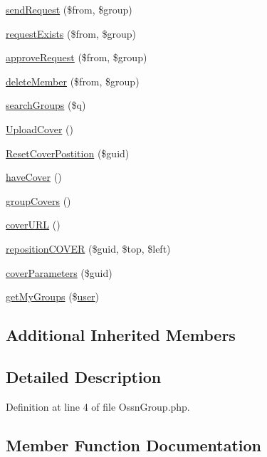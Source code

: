 \begin{DoxyCompactItemize}
\item 
\hyperlink{class_ossn_group_a74cf873217411619b5214ef4546bdaf6}{send\+Request} (\$from, \$group)
\item 
\hyperlink{class_ossn_group_a1845c2df62ccdef4f3fa076e42280877}{request\+Exists} (\$from, \$group)
\item 
\hyperlink{class_ossn_group_ae75e51db4e647a7bc8badf2d9630e475}{approve\+Request} (\$from, \$group)
\item 
\hyperlink{class_ossn_group_af549f54147f805d3624589fdb9e7cfaf}{delete\+Member} (\$from, \$group)
\item 
\hyperlink{class_ossn_group_ad15589659e77e2c5c32b825b04b5da3c}{search\+Groups} (\$q)
\item 
\hyperlink{class_ossn_group_aac6531556a8c140872610e8acc5a9eb1}{Upload\+Cover} ()
\item 
\hyperlink{class_ossn_group_af3c559710a53f8f4d88f38044505ee90}{Reset\+Cover\+Postition} (\$guid)
\item 
\hyperlink{class_ossn_group_a47cc8cd2fcde5ffef4f316341a910fdf}{have\+Cover} ()
\item 
\hyperlink{class_ossn_group_a0727aa262ae755a8a2028acfa9ff3443}{group\+Covers} ()
\item 
\hyperlink{class_ossn_group_a369080897a012c8eeff795c09fb8fb52}{cover\+U\+RL} ()
\item 
\hyperlink{class_ossn_group_a3e27e9dc5d2c3e06eea8801353ebab6f}{reposition\+C\+O\+V\+ER} (\$guid, \$top, \$left)
\item 
\hyperlink{class_ossn_group_a680f6835f3771d0af210dec9e142dd2c}{cover\+Parameters} (\$guid)
\item 
\hyperlink{class_ossn_group_a61f4a98193810fbb807a14d8c78196b5}{get\+My\+Groups} (\$\hyperlink{ossn_8config_8db_8example_8php_a802544b7ba9f79bbf24ef67773d53bed}{user})
\end{DoxyCompactItemize}
\subsection*{Additional Inherited Members}


\subsection{Detailed Description}


Definition at line 4 of file Ossn\+Group.\+php.



\subsection{Member Function Documentation}
